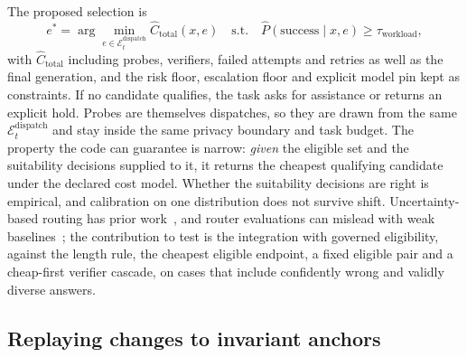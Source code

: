 \documentclass[11pt]{article}
\newcommand{\E}{\mathcal{E}}
\begin{document}
The proposed selection is
\begin{equation}
  e^{*} = \arg\min_{e \in \E_t^{\mathrm{dispatch}}} \widehat{C}_{\mathrm{total}}(x, e)
  \quad \text{s.t.} \quad
  \widehat{P}(\mathrm{success} \mid x, e) \ge \tau_{\mathrm{workload}},
  \label{eq:smartselect}
\end{equation}
with $\widehat{C}_{\mathrm{total}}$ including probes, verifiers, failed attempts and retries as
well as the final generation, and the risk floor, escalation floor and explicit model pin kept
as constraints. If no candidate qualifies, the task asks for assistance or returns an explicit
hold. Probes are themselves dispatches, so they are drawn from the same
$\E_t^{\mathrm{dispatch}}$ and stay inside the same privacy boundary and task budget. The
property the code can guarantee is narrow: \emph{given} the eligible set and the suitability
decisions supplied to it, it returns the cheapest qualifying candidate under the declared cost
model. Whether the suitability decisions are right is empirical, and calibration on one
distribution does not survive shift. Uncertainty-based routing has prior
work~\cite{uncertaintyrouting}, and router evaluations can mislead with weak
baselines~\cite{misguided}; the contribution to test is the integration with governed
eligibility, against the length rule, the cheapest eligible endpoint, a fixed eligible pair and
a cheap-first verifier cascade, on cases that include confidently wrong and validly diverse
answers.

\subsection{Replaying changes to invariant anchors}
\label{sec:smart-anchor}
\end{document}
